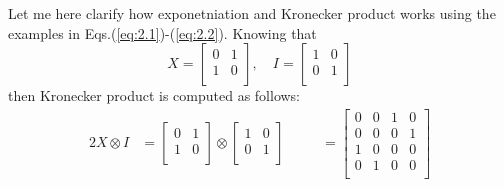 \documentclass[inscr,ack,preface]{diphdthesis}
\begin{document}
Let me here clarify how exponetniation and Kronecker product works using the examples in Eqs.(\ref{eq:2.1})-(\ref{eq:2.2}). Knowing that
\[
X = \begin{bmatrix}
0 & 1 \\
1 & 0 \\
\end{bmatrix},
\quad
I = \begin{bmatrix}
1 & 0 \\
0 & 1 \\
\end{bmatrix}
\]
then Kronecker product is computed as follows:\\
\begin{alignat*}{2}
X \otimes I &= \begin{bmatrix}
    0 & 1 \\
    1 & 0 \\
\end{bmatrix} \otimes \begin{bmatrix}
    1 & 0 \\
    0 & 1 \\
\end{bmatrix} &\quad&
= \begin{bmatrix}
    0 & 0 & 1 & 0 \\
    0 & 0 & 0 & 1 \\
    1 & 0 & 0 & 0 \\
    0 & 1 & 0 & 0 \\
\end{bmatrix}
\end{alignat*}
\end{document}

